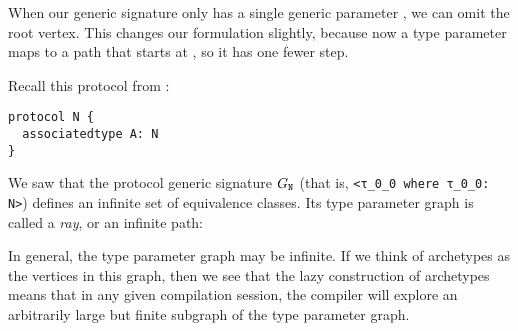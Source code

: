 \documentclass[../generics]{subfiles}
\begin{document}
When our generic signature only has a single generic parameter \rT, we can omit the root vertex. This changes our formulation slightly, because now a type parameter maps to a path that starts at \rT, so it has one fewer step.

\begin{example}\label{protocol n graph} Recall this protocol from :
\begin{Verbatim}
protocol N {
  associatedtype A: N
}
\end{Verbatim}
We saw that the protocol generic signature $G_{\texttt{N}}$ (that is, \verb|<τ_0_0 where τ_0_0: N>|) defines an infinite set of equivalence classes. Its type parameter graph is called a \emph{ray}, or an infinite path:
\begin{center}
\end{center}
\end{example}

In general, the type parameter graph may be infinite. If we think of archetypes as the vertices in this graph, then we see that the lazy construction of archetypes means that in any given compilation session, the compiler will explore an arbitrarily large but finite subgraph of the type parameter graph.
\end{document}

